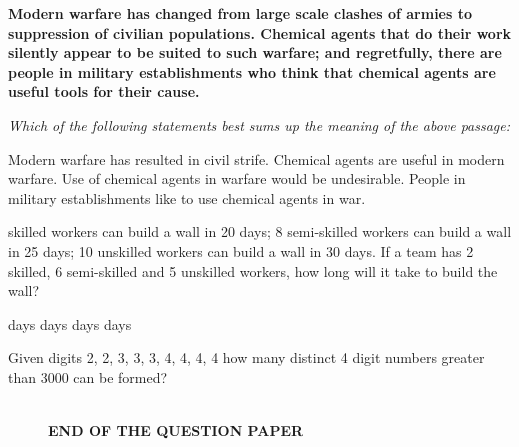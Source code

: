 \documentclass{exam}
\begin{document}
\begin{questions}
\question \textbf{Modern warfare has changed from large scale clashes of armies to suppression of civilian populations. Chemical agents that do their work silently appear to be suited to such warfare; and regretfully, there are people in military establishments who think that chemical agents are useful tools for their cause.}
	\par\noindent \textit{Which of the following statements best sums up the meaning of the above passage:}\hfill{}

\begin{oneparchoices}
	\choice Modern warfare has resulted in civil strife.
	\choice Chemical agents are useful in modern warfare.
	\choice Use of chemical agents in warfare would be undesirable.
	\choice People in military establishments like to use chemical agents in war.
\end{oneparchoices}

 skilled workers can build a wall in 20 days; 8 semi-skilled workers can build a wall in 25 days; 10 unskilled workers can build a wall in 30 days. If a team has 2 skilled, 6 semi-skilled and 5 unskilled workers, how long will it take to build the wall?\hfill{}

\begin{oneparchoices}
	 days  days  days  days
\end{oneparchoices}

\question Given digits 2, 2, 3, 3, 3, 4, 4, 4, 4 how many distinct 4 digit numbers greater than 3000 can be formed?\hfill{}

\begin{oneparchoices}
	   
\end{oneparchoices}
\end{questions}

\begin{figure}[H] \centering
	\hrulefill\\
	\textbf{END OF THE QUESTION PAPER}
\end{figure}
\end{document}
